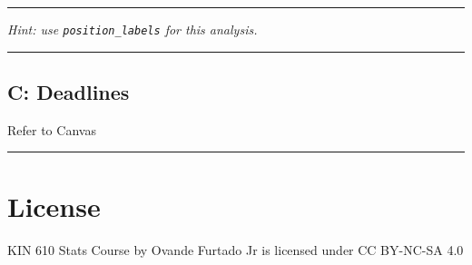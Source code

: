 \documentclass[
]{article}
\begin{document}
\begin{center}\rule{0.5\linewidth}{0.5pt}\end{center}

\emph{Hint: use \texttt{position\_labels} for this analysis.}

\begin{center}\rule{0.5\linewidth}{0.5pt}\end{center}

\hypertarget{deadlines}{%
\subsection{C: Deadlines}\label{deadlines}}

Refer to Canvas

\begin{center}\rule{0.5\linewidth}{0.5pt}\end{center}

\hypertarget{license}{%
\section{License}\label{license}}

KIN 610 Stats Course by Ovande Furtado Jr is licensed under CC BY-NC-SA 4.0
\end{document}
